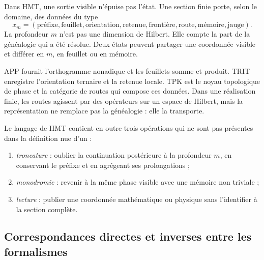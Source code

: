 Dans HMT, une sortie visible n'épuise pas l'état. Une section finie
porte, selon le domaine, des données du type
\[
 x_m=(\text{préfixe},\text{feuillet},\text{orientation},\text{retenue},
       \text{frontière},\text{route},\text{mémoire},\text{jauge}).
 \tag{GMC-1.4}
\]
La profondeur $m$ n'est pas une dimension de Hilbert. Elle compte la part de la
généalogie qui a été résolue. Deux états peuvent partager une coordonnée visible et
différer en $m$, en feuillet ou en mémoire.

APP fournit l'orthogramme nonadique et les feuillets somme et produit. TRIT
enregistre l'orientation ternaire et la retenue locale. TPK est le noyau
topologique de phase et la catégorie de routes qui compose ces données. Dans une
réalisation finie, les routes agissent par des opérateurs sur un espace de
Hilbert, mais la représentation ne remplace pas la généalogie : elle la transporte.

Le langage de HMT contient en outre trois opérations qui ne sont pas présentes dans
la définition nue d'un \QMS :

\begin{enumerate}
  \item \emph{troncature} : oublier la continuation postérieure à la profondeur
  $m$, en conservant le préfixe et en agrégeant ses prolongations ;
  \item \emph{monodromie} : revenir à la même phase visible avec une mémoire non
  triviale ;
  \item \emph{lecture} : publier une coordonnée mathématique ou physique sans
  l'identifier à la section complète.
\end{enumerate}

\Needspace{.74\textheight}
\subsection{Correspondances directes et inverses entre les formalismes}

